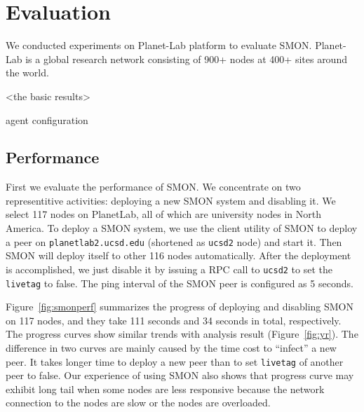 \section{Evaluation}
\label{sec:eval}

We conducted experiments on Planet-Lab platform to evaluate
SMON. Planet-Lab is a global research network consisting of
900+ nodes at 400+ sites around the world.

<the basic results>

agent configuration

%

\subsection{Performance}

First we evaluate the performance of SMON. We concentrate on
two representitive activities: deploying a new SMON system
and disabling it. We select 117 nodes on PlanetLab, all of
which are university nodes in North America. To deploy a
SMON system, we use the client utility of SMON to deploy a
peer on \texttt{planet\-lab2.ucsd.edu} (shortened as
\texttt{ucsd2} node) and start it. Then SMON will deploy
itself to other 116 nodes automatically. After the
deployment is accomplished, we just disable it by issuing a
RPC call to \texttt{ucsd2} to set the \texttt{livetag} to
false.  The ping interval of the SMON peer is configured as
5 seconds.

Figure~\ref{fig:smonperf} summarizes the progress of
deploying and disabling SMON on 117 nodes, and they take
111 seconds and 34 seconds in total, respectively. The
progress curves show similar trends with analysis result
(Figure~\ref{fig:yr}). The difference in two curves are
mainly caused by the time cost to ``infect'' a new peer. It
takes longer time to deploy a new peer than to set
\texttt{livetag} of another peer to false. Our experience
of using SMON also shows that progress curve may exhibit
long tail when some nodes are less responsive because the
network connection to the nodes are slow or the nodes are
overloaded.

